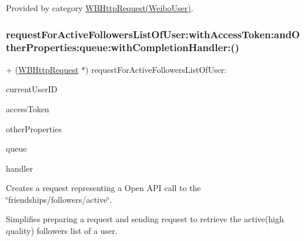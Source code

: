 Provided by category \mbox{\hyperlink{category_w_b_http_request_07_weibo_user_08_a158110b5d079d1ddd7baae029a8a36fb}{W\+B\+Http\+Request(\+Weibo\+User)}}.

\mbox{\label{interface_w_b_http_request_a158110b5d079d1ddd7baae029a8a36fb}} 
\subsubsection{\texorpdfstring{request\+For\+Active\+Followers\+List\+Of\+User\+:with\+Access\+Token\+:and\+Other\+Properties\+:queue\+:with\+Completion\+Handler\+:()}{requestForActiveFollowersListOfUser:withAccessToken:andOtherProperties:queue:withCompletionHandler:()}\hspace{0.1cm}{\footnotesize\ttfamily [3/3]}}
{\footnotesize\ttfamily + (\mbox{\hyperlink{interface_w_b_http_request}{W\+B\+Http\+Request}} $\ast$) request\+For\+Active\+Followers\+List\+Of\+User\+: \begin{DoxyParamCaption}\item[{(N\+S\+String $\ast$)}]{current\+User\+ID }\item[{withAccessToken:(N\+S\+String $\ast$)}]{access\+Token }\item[{andOtherProperties:(N\+S\+Dictionary $\ast$)}]{other\+Properties }\item[{queue:(N\+S\+Operation\+Queue $\ast$)}]{queue }\item[{withCompletionHandler:(W\+B\+Request\+Handler)}]{handler }\end{DoxyParamCaption}}

Creates a request representing a Open A\+PI call to the \char`\"{}friendships/followers/active\char`\"{}.

Simplifies preparing a request and sending request to retrieve the active(high quality) followers list of a user.

